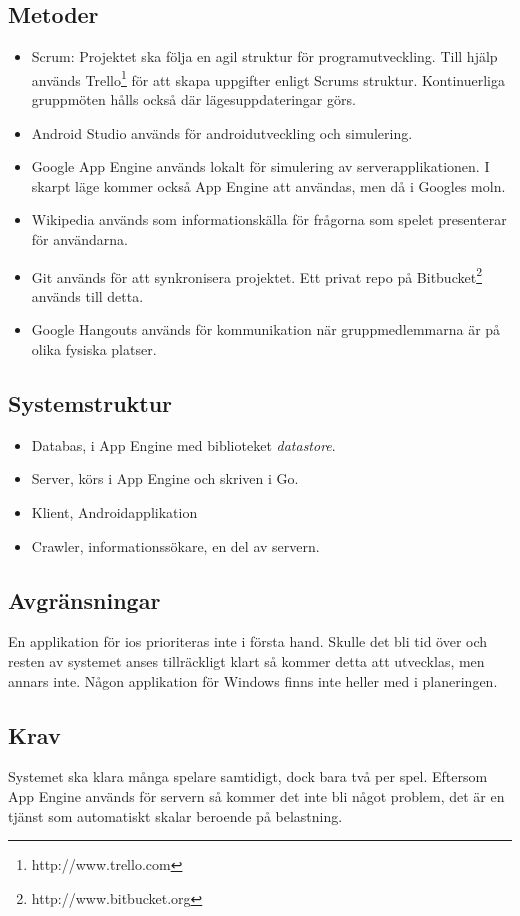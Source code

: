 \documentclass[12pt,a4paper]{article}
\begin{document}
\subsection{Metoder}
\begin{itemize}
\item Scrum: Projektet ska följa en agil struktur för programutveckling. Till hjälp används Trello\footnote{http://www.trello.com} för att skapa uppgifter enligt Scrums struktur. Kontinuerliga gruppmöten hålls också där lägesuppdateringar görs.
\item Android Studio används för androidutveckling och simulering.
\item Google App Engine används lokalt för simulering av serverapplikationen. I skarpt läge kommer också App Engine att användas, men då i Googles moln.
\item Wikipedia används som informationskälla för frågorna som spelet presenterar för användarna.
\item Git används för att synkronisera projektet. Ett privat repo på Bitbucket\footnote{http://www.bitbucket.org} används till detta.
\item Google Hangouts används för kommunikation när gruppmedlemmarna är på olika fysiska platser.
\end{itemize}
\subsection{Systemstruktur}
\begin{itemize}
\item Databas, i App Engine med biblioteket \textit{datastore}.
\item Server, körs i App Engine och skriven i Go.
\item Klient, Androidapplikation
\item Crawler, informationssökare, en del av servern.
\end{itemize}
\subsection{Avgränsningar}
En applikation för ios prioriteras inte i första hand. Skulle det bli tid över och resten av systemet anses tillräckligt klart så kommer detta att utvecklas, men annars inte. Någon applikation för Windows finns inte heller med i planeringen.
\subsection{Krav}
Systemet ska klara många spelare samtidigt, dock bara två per spel. Eftersom App Engine används för servern så kommer det inte bli något problem, det är en tjänst som automatiskt skalar beroende på belastning.
\end{document}
